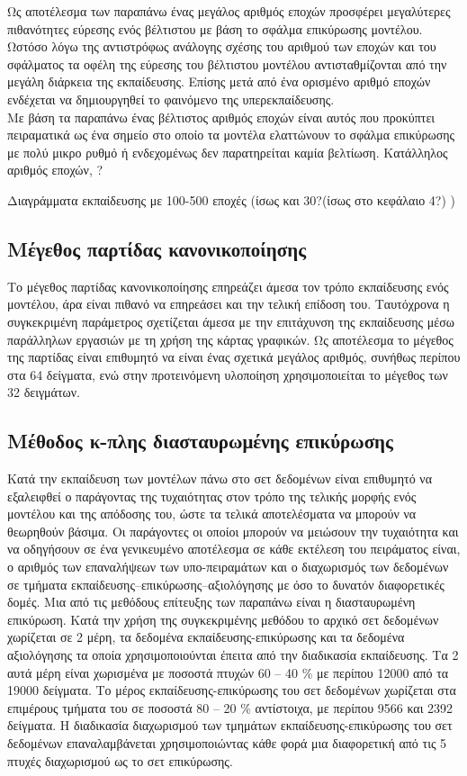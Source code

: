 Ως αποτέλεσμα των παραπάνω ένας μεγάλος αριθμός εποχών προσφέρει μεγαλύτερες πιθανότητες εύρεσης ενός βέλτιστου με βάση το σφάλμα επικύρωσης μοντέλου. Ωστόσο λόγω της αντιστρόφως ανάλογης σχέσης του αριθμού των εποχών και του σφάλματος τα οφέλη της εύρεσης του βέλτιστου μοντέλου αντισταθμίζονται από την μεγάλη διάρκεια της εκπαίδευσης. Επίσης μετά από ένα ορισμένο αριθμό εποχών ενδέχεται να δημιουργηθεί το φαινόμενο της υπερεκπαίδευσης.\\

Με βάση τα παραπάνω ένας βέλτιστος αριθμός εποχών είναι αυτός που προκύπτει πειραματικά ως ένα σημείο στο οποίο τα μοντέλα ελαττώνουν το σφάλμα επικύρωσης με πολύ μικρο ρυθμό ή ενδεχομένως δεν παρατηρείται καμία βελτίωση.
Κατάλληλος αριθμός εποχών, ?

Διαγράμματα εκπαίδευσης με 100-500 εποχές (ίσως και 30?(ίσως στο κεφάλαιο 4?) )


\subsection{Μέγεθος παρτίδας κανονικοποίησης}
Το μέγεθος παρτίδας κανονικοποίησης επηρεάζει άμεσα τον τρόπο εκπαίδευσης ενός μοντέλου, άρα είναι πιθανό να επηρεάσει και την τελική επίδοση του. Ταυτόχρονα η συγκεκριμένη παράμετρος σχετίζεται άμεσα με την επιτάχυνση της εκπαίδευσης μέσω παράλληλων εργασιών με τη χρήση της κάρτας γραφικών. Ως αποτέλεσμα  το μέγεθος της παρτίδας είναι επιθυμητό να είναι ένας σχετικά μεγάλος αριθμός, συνήθως περίπου στα 64 δείγματα, ενώ στην προτεινόμενη υλοποίηση χρησιμοποιείται το μέγεθος των 32 δειγμάτων.

\subsection{Μέθοδος κ-πλης διασταυρωμένης επικύρωσης}
Κατά την εκπαίδευση των μοντέλων πάνω στο σετ δεδομένων είναι επιθυμητό να εξαλειφθεί ο παράγοντας της τυχαιότητας στον τρόπο της τελικής μορφής ενός μοντέλου και της απόδοσης του, ώστε τα τελικά αποτελέσματα να μπορούν να θεωρηθούν βάσιμα.
Οι παράγοντες οι οποίοι μπορούν να μειώσουν την τυχαιότητα και να οδηγήσουν σε ένα γενικευμένο αποτέλεσμα σε κάθε εκτέλεση του πειράματος είναι, ο αριθμός των επαναλήψεων των υπο-πειραμάτων και ο διαχωρισμός των δεδομένων σε τμήματα εκπαίδευσης--επικύρωσης--αξιολόγησης με όσο το δυνατόν διαφορετικές δομές.
Μια από τις μεθόδους επίτευξης των παραπάνω είναι η διασταυρωμένη επικύρωση. Κατά την χρήση της συγκεκριμένης μεθόδου το αρχικό σετ δεδομένων χωρίζεται σε 2 μέρη, τα δεδομένα εκπαίδευσης-επικύρωσης και τα δεδομένα αξιολόγησης τα οποία χρησιμοποιούνται έπειτα από την διαδικασία εκπαίδευσης. Τα 2 αυτά μέρη είναι χωρισμένα με ποσοστά πτυχών 60 -- 40 \% με περίπου 12000 από τα 19000 δείγματα. Το μέρος εκπαίδευσης-επικύρωσης του σετ δεδομένων χωρίζεται στα επιμέρους τμήματα του σε ποσοστά 80 -- 20 \% αντίστοιχα, με περίπου 9566 και 2392 δείγματα.
Η διαδικασία διαχωρισμού των τμημάτων εκπαίδευσης-επικύρωσης του σετ δεδομένων επαναλαμβάνεται χρησιμοποιώντας κάθε φορά μια διαφορετική από τις 5 πτυχές διαχωρισμού ως το σετ επικύρωσης.

